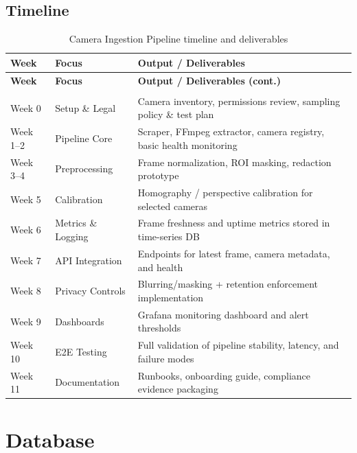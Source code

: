 \subsection{Timeline}
\renewcommand{\arraystretch}{1.15}
\begin{longtable}{|>{\raggedright\arraybackslash}p{}|>{\raggedright\arraybackslash}p{}|>{\raggedright\arraybackslash}p{}|}
\caption{Camera Ingestion Pipeline timeline and deliverables}\label{tab:camera-ingestion-timeline}\\
\hline
									\textbf{Week} & \textbf{Focus} & \textbf{Output / Deliverables} \\
\hline
\endfirsthead
\hline
									\textbf{Week} & \textbf{Focus} & \textbf{Output / Deliverables (cont.)} \\
\hline
\endhead
\hline
\multicolumn{3}{r}{\small Continued on next page} \\
\hline
\endfoot
\hline
\endlastfoot
Week 0 & Setup \& Legal & Camera inventory, permissions review, sampling policy \& test plan \\
\hline
Week 1--2 & Pipeline Core & Scraper, FFmpeg extractor, camera registry, basic health monitoring \\
\hline
Week 3--4 & Preprocessing & Frame normalization, ROI masking, redaction prototype \\
\hline
Week 5 & Calibration & Homography / perspective calibration for selected cameras \\
\hline
Week 6 & Metrics \& Logging & Frame freshness and uptime metrics stored in time-series DB \\
\hline
Week 7 & API Integration & Endpoints for latest frame, camera metadata, and health \\
\hline
Week 8 & Privacy Controls & Blurring/masking + retention enforcement implementation \\
\hline
Week 9 & Dashboards & Grafana monitoring dashboard and alert thresholds \\
\hline
Week 10 & E2E Testing & Full validation of pipeline stability, latency, and failure modes \\
\hline
Week 11 & Documentation & Runbooks, onboarding guide, compliance evidence packaging \\
\hline
\end{longtable}

\section{Database}
\label{sec:database}
